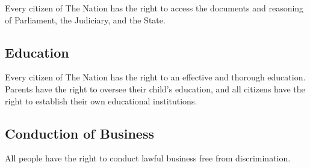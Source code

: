 \documentclass{report}
\newcommand{\nation}{The Nation}
\begin{document}
    Every citizen of \nation{} has the right to access the documents and
    reasoning of Parliament, the Judiciary, and the State.

    \subsection{Education}

    Every citizen of \nation{} has the right to an effective and thorough
    education. Parents have the right to oversee their child's education, and
    all citizens have the right to establish their own educational institutions.

    \subsection{Conduction of Business}

    All people have the right to conduct lawful business free from discrimination.
\end{document}
